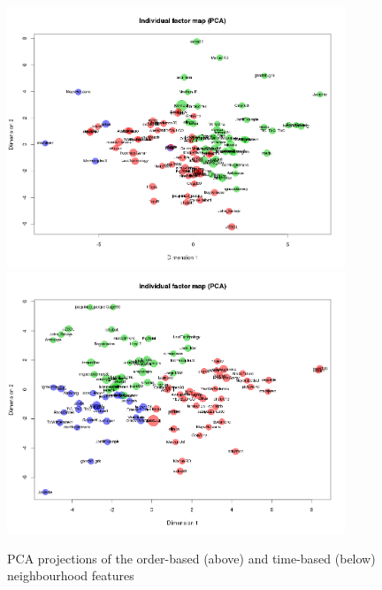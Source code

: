 \documentclass[conference]{IEEEtran}
\begin{document}
\begin{figure}
	\centering
	\includegraphics[width=0.9\textwidth]{PCA_cluster_orderbased}
	\includegraphics[width=0.9\textwidth]{PCA_cluster_timebased}
	\caption{PCA projections of the order-based (above) and time-based (below) neighbourhood features}
	\label{fig:PCA}
\end{figure}

\end{document}
